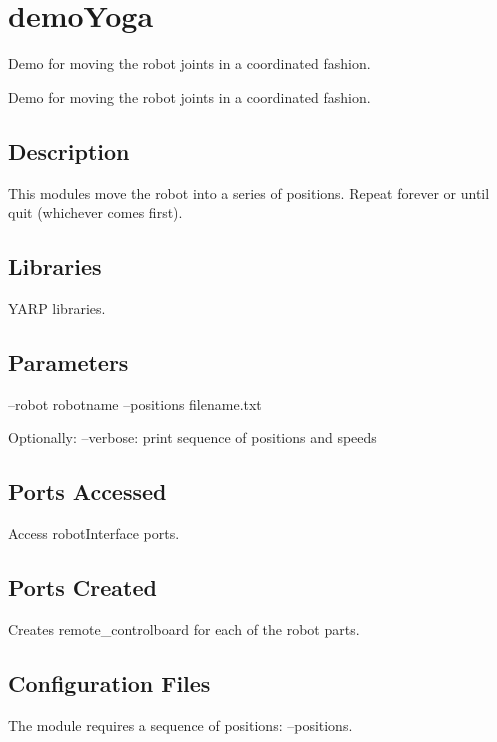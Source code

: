 \section{demo\+Yoga}
\label{group__src__demoYoga}


Demo for moving the robot joints in a coordinated fashion.  


Demo for moving the robot joints in a coordinated fashion. 

\hypertarget{group__src__demoYoga_intro_sec}{}\subsection{Description}\label{group__src__demoYoga_intro_sec}
This modules move the robot into a series of positions. Repeat forever or until quit (whichever comes first).\hypertarget{group__src__demoYoga_lib_sec}{}\subsection{Libraries}\label{group__src__demoYoga_lib_sec}
Y\+A\+RP libraries.\hypertarget{group__src__demoYoga_parameters_sec}{}\subsection{Parameters}\label{group__src__demoYoga_parameters_sec}
--robot robotname --positions filename.\+txt

Optionally\+: --verbose\+: print sequence of positions and speeds\hypertarget{group__src__demoYoga_portsa_sec}{}\subsection{Ports Accessed}\label{group__src__demoYoga_portsa_sec}
Access robot\+Interface ports.\hypertarget{group__src__demoYoga_portsc_sec}{}\subsection{Ports Created}\label{group__src__demoYoga_portsc_sec}
Creates remote\+\_\+controlboard for each of the robot parts.\hypertarget{group__src__demoYoga_conf_file_sec}{}\subsection{Configuration Files}\label{group__src__demoYoga_conf_file_sec}
The module requires a sequence of positions\+: --positions.

